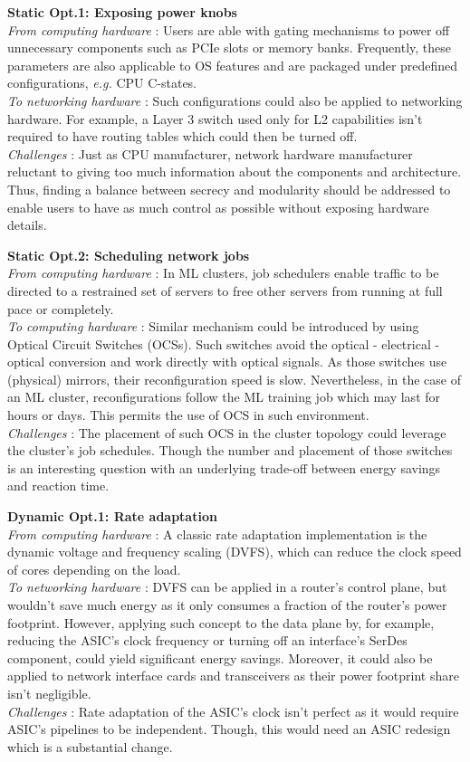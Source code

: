 \textbf{Static Opt.1: Exposing power knobs}\\
\textit{From computing hardware} : Users are able with gating mechanisms to power off unnecessary components such as PCIe slots or memory banks.
Frequently, these parameters are also applicable to OS features and are packaged under predefined configurations, \textit{e.g.} CPU C-states. \\
\textit{To networking hardware} : Such configurations could also be applied to networking hardware.
For example, a Layer 3 switch used only for L2 capabilities isn't required to have routing tables which could then be turned off.\\
\textit{Challenges} : Just as CPU manufacturer, network hardware manufacturer reluctant to giving too much information about the components and architecture. 
Thus, finding a balance between secrecy and modularity should be addressed to enable users to have as much control as possible without exposing hardware details.


\textbf{Static Opt.2: Scheduling network jobs}
\\\textit{From computing hardware} : In ML clusters, job schedulers enable traffic to be directed to a restrained set of servers to free other servers from running at full pace or completely.   
\\\textit{To computing hardware} : Similar mechanism could be introduced by using Optical Circuit Switches (OCSs). Such switches avoid the optical - electrical - optical conversion and work directly with optical signals. 
As those switches use (physical) mirrors, their reconfiguration speed is slow.
Nevertheless, in the case of an ML cluster, reconfigurations follow the ML training job which may last for hours or days.
This permits the use of OCS in such environment. 
\\\textit{Challenges} : The placement of such OCS in the cluster topology could leverage the cluster's job schedules.
Though the number and placement of those switches is an interesting question with an underlying trade-off between energy savings and reaction time. 


\textbf{Dynamic Opt.1: Rate adaptation}
\\\textit{From computing hardware} : A classic rate adaptation implementation is the dynamic voltage and frequency scaling (DVFS), which can reduce the clock speed of cores depending on the load.
\\\textit{To networking hardware} : DVFS can be applied in a router's control plane, but wouldn't save much energy as it only consumes a fraction of the router's power footprint.
However, applying such concept to the data plane by, for example, reducing the ASIC's clock frequency or turning off an interface's SerDes component, could yield significant energy savings.
Moreover, it could also be applied to network interface cards and transceivers as their power footprint share isn't negligible.
\\\textit{Challenges} : Rate adaptation of the ASIC's clock isn't perfect as it would require ASIC's pipelines to be independent.
Though, this would need an ASIC redesign which is a substantial change. 


